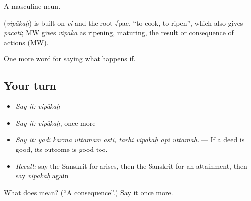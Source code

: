 A masculine noun.

\begin{cousinweb}
\textbf{} (\emph{vipākaḥ}) is built on \emph{vi} and the root √pac, \textquotedblleft{}to cook, to ripen\textquotedblright{}, which also gives \emph{pacati}; MW gives \emph{vipāka} as ripening, maturing, the result or consequence of actions (MW).
\end{cousinweb}

\begin{grammarlens}[title={What you've built}]
One more word for saying what happens if.
\end{grammarlens}

\subsection*{Your turn}
\begin{itemize}
\raggedright
  \item \emph{Say it:} \emph{vipākaḥ}
  \item \emph{Say it:} \emph{vipākaḥ}, once more
  \item \emph{Say it:} \emph{yadi karma uttamam asti, tarhi vipākaḥ api uttamaḥ.} — If a deed is good, its outcome is good too.
  \item \emph{Recall:} say the Sanskrit for arises, then the Sanskrit for an attainment, then say \emph{vipākaḥ} again
\end{itemize}

\begin{tcolorbox}[breakable,colback=teal!4,colframe=teal!35!black,title={Before you move on}]
What does  mean? (\textquotedblleft{}A consequence\textquotedblright{}.) Say it once more.
\end{tcolorbox}
